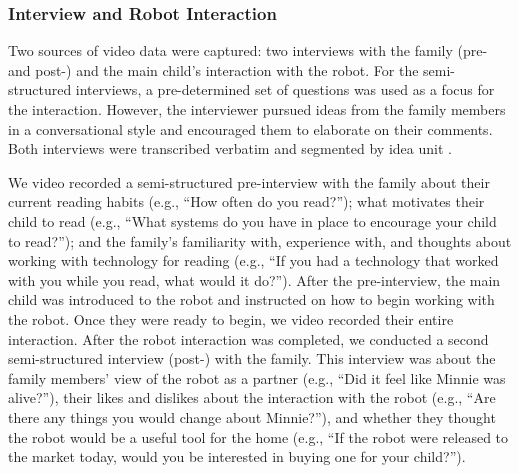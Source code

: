 \documentclass{sigchi}
\begin{document}
\subsubsection{Interview and Robot Interaction}
Two sources of video data were captured: two interviews with the family (pre- and post-) and the main child's interaction with the robot. For the semi-structured interviews, a pre-determined set of questions was used as a focus for the interaction. However, the interviewer pursued ideas from the family members in a conversational style and encouraged them to elaborate on their comments. Both interviews were transcribed verbatim and segmented by idea unit \cite{Chi:1997}.
 
We video recorded a semi-structured pre-interview with the family about their current reading habits (e.g., ``How often do you read?''); what motivates their child to read (e.g., ``What systems do you have in place to encourage your child to read?''); and the family's familiarity with, experience with, and thoughts about working with technology for reading (e.g., ``If you had a technology that worked with you while you read, what would it do?''). After the pre-interview, the main child was introduced to the robot and instructed on how to begin working with the robot. Once they were ready to begin, we video recorded their entire interaction. After the robot interaction was completed, we conducted a second semi-structured interview (post-) with the family. This interview was about the family members' view of the robot as a partner (e.g., ``Did it feel like Minnie was alive?''), their likes and dislikes about the interaction with the robot (e.g., ``Are there any things you would change about Minnie?''), and whether they thought the robot would be a useful tool for the home (e.g., ``If the robot were released to the market today, would you be interested in buying one for your child?'').
\end{document}
